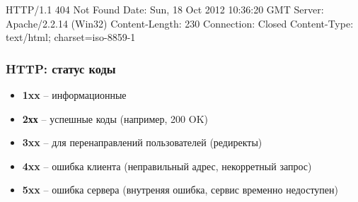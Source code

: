        \begin{bminted}
HTTP/1.1 404 Not Found
Date: Sun, 18 Oct 2012 10:36:20 GMT
Server: Apache/2.2.14 (Win32)
Content-Length: 230
Connection: Closed
Content-Type: text/html; charset=iso-8859-1
    \end{bminted}
  
  \subsubsection{HTTP: статус коды}
    \begin{itemize}
      \item \textbf{1xx} – информационные
      \item \textbf{2хх} – успешные коды (например, 200 OK)
      \item \textbf{3xx} – для перенаправлений пользователей (редиректы)
      \item \textbf{4xx} – ошибка клиента (неправильный адрес, некорретный запрос)
      \item \textbf{5xx} – ошибка сервера (внутреняя ошибка, сервис временно недоступен)
    \end{itemize}

